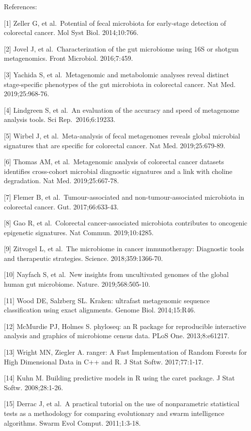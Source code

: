 \documentclass[
]{article}
\begin{document}
References:

{[}1{]} Zeller G, et al.~Potential of fecal microbiota for early‐stage
detection of colorectal cancer. Mol Syst Biol. 2014;10:766.

{[}2{]} Jovel J, et al.~Characterization of the gut microbiome using 16S
or shotgun metagenomics. Front Microbiol. 2016;7:459.

{[}3{]} Yachida S, et al.~Metagenomic and metabolomic analyses reveal
distinct stage-specific phenotypes of the gut microbiota in colorectal
cancer. Nat Med. 2019;25:968-76.

{[}4{]} Lindgreen S, et al.~An evaluation of the accuracy and speed of
metagenome analysis tools. Sci Rep.~2016;6:19233.

{[}5{]} Wirbel J, et al.~Meta-analysis of fecal metagenomes reveals
global microbial signatures that are specific for colorectal cancer. Nat
Med. 2019;25:679-89.

{[}6{]} Thomas AM, et al.~Metagenomic analysis of colorectal cancer
datasets identifies cross-cohort microbial diagnostic signatures and a
link with choline degradation. Nat Med. 2019;25:667-78.

{[}7{]} Flemer B, et al.~Tumour-associated and non-tumour-associated
microbiota in colorectal cancer. Gut. 2017;66:633-43.

{[}8{]} Gao R, et al.~Colorectal cancer-associated microbiota
contributes to oncogenic epigenetic signatures. Nat Commun.
2019;10:4285.

{[}9{]} Zitvogel L, et al.~The microbiome in cancer immunotherapy:
Diagnostic tools and therapeutic strategies. Science. 2018;359:1366-70.

{[}10{]} Nayfach S, et al.~New insights from uncultivated genomes of the
global human gut microbiome. Nature. 2019;568:505-10.

{[}11{]} Wood DE, Salzberg SL. Kraken: ultrafast metagenomic sequence
classification using exact alignments. Genome Biol. 2014;15:R46.

{[}12{]} McMurdie PJ, Holmes S. phyloseq: an R package for reproducible
interactive analysis and graphics of microbiome census data. PLoS One.
2013;8:e61217.

{[}13{]} Wright MN, Ziegler A. ranger: A Fast Implementation of Random
Forests for High Dimensional Data in C++ and R. J Stat Softw.
2017;77:1-17.

{[}14{]} Kuhn M. Building predictive models in R using the caret
package. J Stat Softw. 2008;28:1-26.

{[}15{]} Derrac J, et al.~A practical tutorial on the use of
nonparametric statistical tests as a methodology for comparing
evolutionary and swarm intelligence algorithms. Swarm Evol Comput.
2011;1:3-18.
\end{document}

